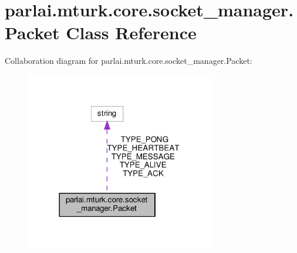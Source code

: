 \hypertarget{classparlai_1_1mturk_1_1core_1_1socket__manager_1_1Packet}{}\section{parlai.\+mturk.\+core.\+socket\+\_\+manager.\+Packet Class Reference}
\label{classparlai_1_1mturk_1_1core_1_1socket__manager_1_1Packet}


Collaboration diagram for parlai.\+mturk.\+core.\+socket\+\_\+manager.\+Packet\+:
\nopagebreak
\begin{figure}[H]
\begin{center}
\leavevmode
\includegraphics[width=234pt]{classparlai_1_1mturk_1_1core_1_1socket__manager_1_1Packet__coll__graph}
\end{center}
\end{figure}
